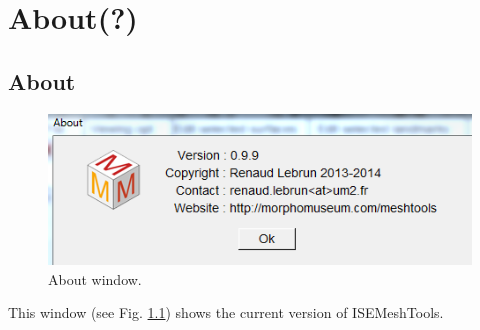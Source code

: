 
\chapter{About(?)}
\minitoc 


\section{About} 
\begin{figure}
  \centering
  \includegraphics[scale=0.5]{images/about/About.png} 
	\caption{About window.}
\label{about}
 
\end{figure}

This window (see Fig. \ref{about}) shows the current version of ISEMeshTools.
